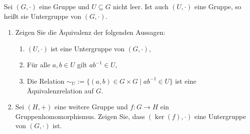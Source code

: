 \documentclass{../problemset}
\author{Michael van Straten}
\begin{document}
\maketitle

\begin{problem}
Sei $(G, \cdot)$ eine Gruppe und $U \subseteq G$ nicht leer. Ist auch $(U, \cdot)$ eine Gruppe, so heißt sie Untergruppe von $(G, \cdot)$.

\begin{enumerate}
	\item Zeigen Sie die Äquivalenz der folgenden Aussagen:
	      \begin{enumerate}[label=\alph*)]
		      \item $(U, \cdot)$ ist eine Untergruppe von $(G, \cdot)$,
		      \item Für alle $a, b \in U$ gilt $ab^{-1} \in U$,
		      \item Die Relation $\sim_U := \{(a, b) \in G \times G \mid ab^{-1} \in U\}$ ist eine Äquivalenzrelation auf $G$.
	      \end{enumerate}
	\item Sei $(H, +)$ eine weitere Gruppe und $f: G \to H$ ein Gruppenhomomorphismus. Zeigen Sie, dass $(\ker(f), \cdot)$ eine Untergruppe von $(G, \cdot)$ ist.
\end{enumerate}


\end{problem}
\end{document}
